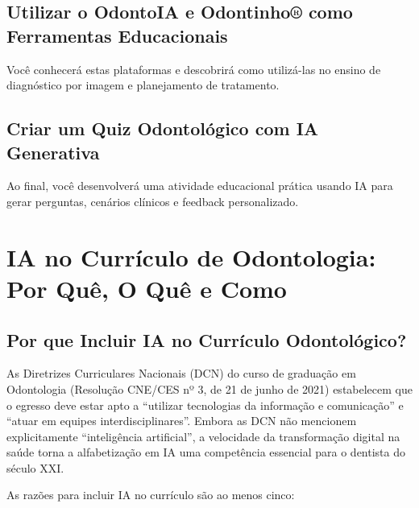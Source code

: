 \subsection{Utilizar o OdontoIA e Odontinho® como Ferramentas Educacionais}
Você conhecerá estas plataformas e descobrirá como utilizá-las no ensino de diagnóstico por imagem e planejamento de tratamento.

\subsection{Criar um Quiz Odontológico com IA Generativa}
Ao final, você desenvolverá uma atividade educacional prática usando IA para gerar perguntas, cenários clínicos e feedback personalizado.

\section{IA no Currículo de Odontologia: Por Quê, O Quê e Como}
\label{sec:curriculo-ia}

\nivelquatro

\subsection{Por que Incluir IA no Currículo Odontológico?}

As Diretrizes Curriculares Nacionais (DCN) do curso de graduação em Odontologia
(Resolução CNE/CES nº 3, de 21 de junho de 2021) estabelecem que o egresso deve
estar apto a ``utilizar tecnologias da informação e comunicação'' e ``atuar em
equipes interdisciplinares''. Embora as DCN não mencionem explicitamente
``inteligência artificial'', a velocidade da transformação digital na saúde
torna a alfabetização em IA uma competência essencial para o dentista do
século XXI.

As razões para incluir IA no currículo são ao menos cinco:

